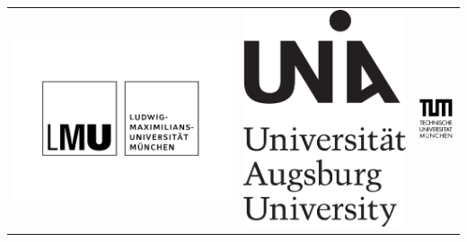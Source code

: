 \thispagestyle{empty}

\begin{table}[h]
\centering
\begin{tabular}{ccc}
\includegraphics[width=.18\linewidth]{img/logos/lmu_logo} \hspace{0.7cm} &
\includegraphics[scale=0.18]{img/logos/Uni_Aug_Logo_Basis_pos_A}
\hspace{0.7cm} &
\includegraphics[scale=0.86]{img/logos/tum}
\end{tabular}
\end{table}

